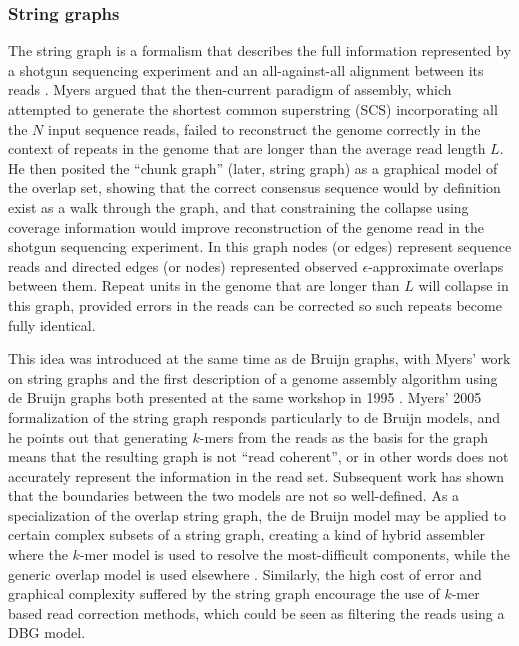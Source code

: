 \subsubsection{String graphs}
\label{sec:string_graphs}

The string graph is a formalism that describes the full information represented by a shotgun sequencing experiment and an all-against-all alignment between its reads \cite{myers1995toward,myers2005fragment}.
Myers argued that the then-current paradigm of assembly, which attempted to generate the shortest common superstring (SCS) incorporating all the $N$ input sequence reads, failed to reconstruct the genome correctly in the context of repeats in the genome that are longer than the average read length $L$.
He then posited the ``chunk graph'' (later, string graph) as a graphical model of the overlap set, showing that the correct consensus sequence would by definition exist as a walk through the graph, and that constraining the collapse using coverage information would improve reconstruction of the genome read in the shotgun sequencing experiment.
In this graph nodes (or edges) represent sequence reads and directed edges (or nodes) represented observed $\epsilon$-approximate overlaps between them.
Repeat units in the genome that are longer than $L$ will collapse in this graph, provided errors in the reads can be corrected so such repeats become fully identical.

This idea was introduced at the same time as de Bruijn graphs, with Myers' work on string graphs and the first description of a genome assembly algorithm using de Bruijn graphs both presented at the same workshop in 1995 \cite{myers1995toward,idury1995new}.
Myers' 2005 formalization of the string graph \cite{myers2005fragment} responds particularly to de Bruijn models, and he points out that generating $k$-mers from the reads as the basis for the graph means that the resulting graph is not ``read coherent'', or in other words does not accurately represent the information in the read set.
Subsequent work has shown that the boundaries between the two models are not so well-defined.
As a specialization of the overlap string graph, the de Bruijn model may be applied to certain complex subsets of a string graph, creating a kind of hybrid assembler where the $k$-mer model is used to resolve the most-difficult components, while the generic overlap model is used elsewhere \cite{huang2016integration}.
Similarly, the high cost of error and graphical complexity suffered by the string graph encourage the use of $k$-mer based read correction methods, which could be seen as filtering the reads using a DBG model.

